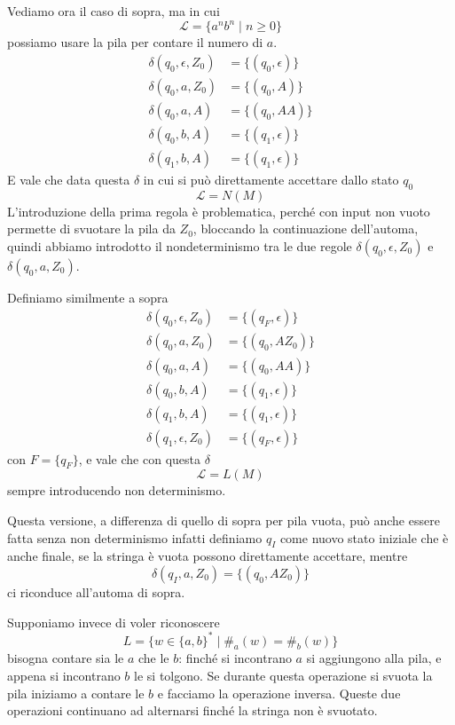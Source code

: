 \documentclass[12pt]{report}
\begin{document}
\begin{tcolorbox}[breakable]
	Vediamo ora il caso di sopra, ma in cui
	$$ \mathcal{L} = \{ a^n b^n \mid n \geq 0 \} $$
	possiamo usare la pila per contare il numero di $a$.
	\begin{align*}
		\delta(q_0, \epsilon, Z_0) &= \{(q_0, \epsilon)\} \\
		\delta(q_0, a, Z_0) &= \{(q_0, A)\} \\
		\delta(q_0, a, A)   &= \{(q_0, AA) \} \\
		\delta(q_0, b, A)   &= \{ (q_1, \epsilon) \} \\
		\delta(q_1, b, A)   &= \{ (q_1, \epsilon) \} 
	\end{align*}
	E vale che data questa $\delta$ in cui si può direttamente accettare dallo stato $q_0$
	$$ \mathcal{L} = N(M) $$
	L'introduzione della prima regola è problematica, perché con input non vuoto permette di svuotare la pila da $Z_0$, bloccando la continuazione dell'automa, quindi abbiamo introdotto il nondeterminismo tra le due regole $\delta(q_0, \epsilon, Z_0)$ e $\delta(q_0, a, Z_0)$.

	Definiamo similmente a sopra
	\begin{align*}
		\delta(q_0, \epsilon, Z_0) &= \{(q_F, \epsilon)\} \\
		\delta(q_0, a, Z_0) &= \{(q_0, AZ_0)\} \\
		\delta(q_0, a, A)   &= \{(q_0, AA)\} \\
		\delta(q_0, b, A)   &= \{(q_1, \epsilon)\} \\
		\delta(q_1, b, A)   &= \{(q_1, \epsilon)\} \\
		\delta(q_1, \epsilon, Z_0) &= \{(q_F, \epsilon)\}
	\end{align*}
	con $F = \{q_F\}$, e vale che con questa $\delta$
	$$ \mathcal{L} = L(M) $$
	sempre introducendo non determinismo.
	
	Questa versione, a differenza di quello di sopra per pila vuota, può anche essere fatta senza non determinismo infatti definiamo $q_I$ come nuovo stato iniziale che è anche finale, se la stringa è vuota possono direttamente accettare, mentre 
	$$ \delta(q_I, a, Z_0) = \{(q_0, AZ_0)\} $$
	ci riconduce all'automa di sopra.
\end{tcolorbox}
\begin{tcolorbox}
	Supponiamo invece di voler riconoscere
	$$ L = \{ w \in \{a, b\}^* \mid \#_a(w) = \#_b(w) \} $$
	bisogna contare sia le $a$ che le $b$: finché si incontrano $a$ si aggiungono alla pila, e appena si incontrano $b$ le si tolgono. 
	Se durante questa operazione si svuota la pila iniziamo a contare le $b$ e facciamo la operazione inversa.
	Queste due operazioni continuano ad alternarsi finché la stringa non è svuotato.
\end{tcolorbox}
\end{document}

